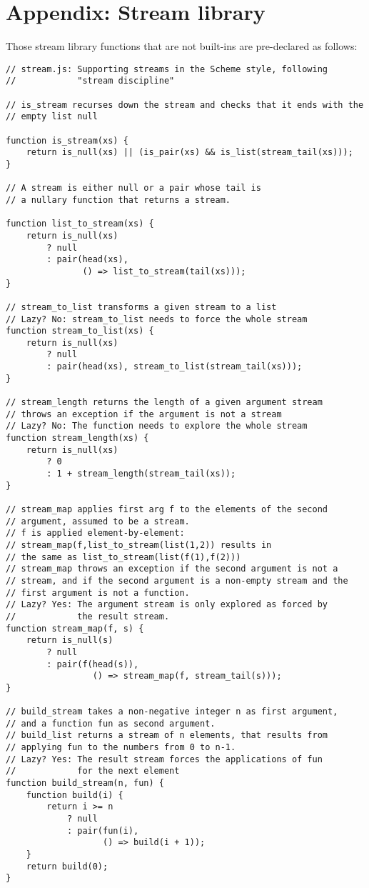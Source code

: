 \section*{Appendix: Stream library}

Those stream library functions that are not built-ins are pre-declared as follows:

\begin{lstlisting}
// stream.js: Supporting streams in the Scheme style, following
//            "stream discipline"

// is_stream recurses down the stream and checks that it ends with the
// empty list null

function is_stream(xs) {
    return is_null(xs) || (is_pair(xs) && is_list(stream_tail(xs)));
}

// A stream is either null or a pair whose tail is
// a nullary function that returns a stream.

function list_to_stream(xs) {
    return is_null(xs)
        ? null
        : pair(head(xs), 
               () => list_to_stream(tail(xs))); 
}

// stream_to_list transforms a given stream to a list
// Lazy? No: stream_to_list needs to force the whole stream
function stream_to_list(xs) {
    return is_null(xs)
        ? null
        : pair(head(xs), stream_to_list(stream_tail(xs)));
}

// stream_length returns the length of a given argument stream
// throws an exception if the argument is not a stream
// Lazy? No: The function needs to explore the whole stream
function stream_length(xs) {
    return is_null(xs)
        ? 0
        : 1 + stream_length(stream_tail(xs));
}

// stream_map applies first arg f to the elements of the second
// argument, assumed to be a stream.
// f is applied element-by-element:
// stream_map(f,list_to_stream(list(1,2)) results in
// the same as list_to_stream(list(f(1),f(2)))
// stream_map throws an exception if the second argument is not a
// stream, and if the second argument is a non-empty stream and the
// first argument is not a function.
// Lazy? Yes: The argument stream is only explored as forced by
//            the result stream.
function stream_map(f, s) {
    return is_null(s)
        ? null
        : pair(f(head(s)), 
                 () => stream_map(f, stream_tail(s)));
}

// build_stream takes a non-negative integer n as first argument,
// and a function fun as second argument.
// build_list returns a stream of n elements, that results from
// applying fun to the numbers from 0 to n-1.
// Lazy? Yes: The result stream forces the applications of fun
//            for the next element
function build_stream(n, fun) {
    function build(i) {
        return i >= n
            ? null
            : pair(fun(i), 
                   () => build(i + 1)); 
    }
    return build(0);
}


\end{lstlisting}

